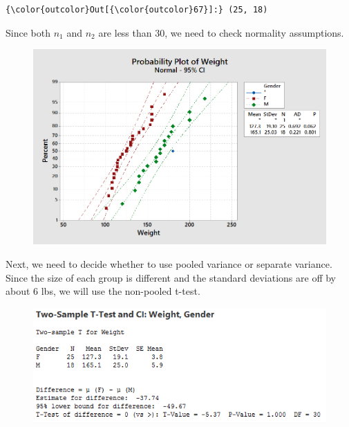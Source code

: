 \documentclass{article}
\begin{document}
            \begin{Verbatim}[commandchars=\\\{\}]
{\color{outcolor}Out[{\color{outcolor}67}]:} (25, 18)
\end{Verbatim}
        
    Since both \(n_1\) and \(n_2\) are less than 30, we need to check
normality assumptions.

\begin{figure}[h!]
 \centering
 \includegraphics[scale=.4,keepaspectratio=true]{./project_files/probplot_weights-male-vs-female.png}
\end{figure}

    Next, we need to decide whether to use pooled variance or separate
variance. Since the size of each group is different and the standard
deviations are off by about 6 lbs, we will use the non-pooled t-test.

\begin{figure}[h!]
 \centering
 \includegraphics[scale=.7,keepaspectratio=true]{./project_files/2-sample_t-test_gender-weight.png}
\end{figure}
\end{document}
